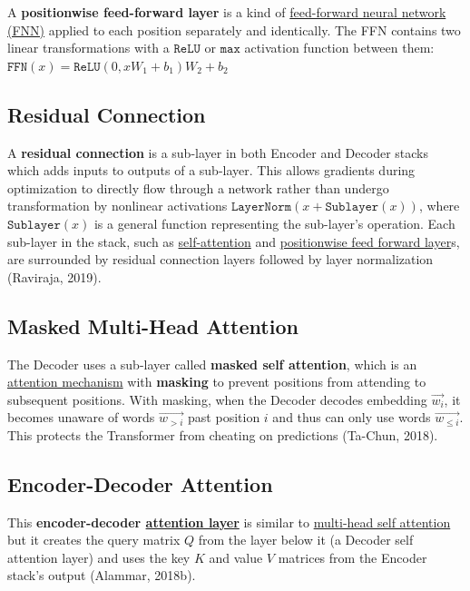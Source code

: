 A \textbf{positionwise feed-forward layer} is a kind of \hyperref[sec:NeuralNetRepr]{feed-forward neural network (FNN)} applied to each position separately and identically. The FFN contains two linear transformations with a $\texttt{ReLU}$ or $\texttt{max}$ activation function between them: $\texttt{FFN}(x) = \texttt{ReLU}(0, x W_1 + b_1) W_2 + b_2$



\subsection{Residual Connection} \label{sec:ResidualConnections}

A \textbf{residual connection} is a sub-layer in both Encoder and Decoder stacks which adds inputs to outputs of a sub-layer. This allows gradients during optimization to directly flow through a network rather than undergo transformation by nonlinear activations $\texttt{LayerNorm}(x + \texttt{Sublayer}(x))$, where $\texttt{Sublayer}(x)$ is a general function representing the sub-layer's operation. Each sub-layer in the stack, such as \hyperref[sec:SelfAttention]{self-attention} and \hyperref[sec:PositionwiseFFNLayers]{positionwise feed forward layer}s, are surrounded by residual connection layers followed by layer normalization (Raviraja, 2019). 




\subsection{Masked Multi-Head Attention} \label{sec:MaskedMultiHeadAttention}

The Decoder uses a sub-layer called \textbf{masked self attention}, which is an \hyperref[sec:AttentionMechanism]{attention mechanism} with \textbf{masking} to prevent positions from attending to subsequent positions. With masking, when the Decoder decodes embedding $\overrightarrow{w_i}$, it becomes unaware of words  $\overrightarrow{w_{>i}}$ past position $i$ and thus can only use words $\overrightarrow{w_{\leq i}}$. This protects the Transformer from cheating on predictions (Ta-Chun, 2018). 

\subsection{Encoder-Decoder Attention} \label{sec:EncoderDecoderAttention}

This \textbf{encoder-decoder \hyperref[sec:AttentionMechanism]{attention layer}} is similar to \hyperref[sec:MultiHeadAttention]{multi-head self attention} but it creates the query matrix $Q$ from the layer below it (a Decoder self attention layer) and uses the key $K$ and value $V$ matrices from the Encoder stack's output (Alammar, 2018b). 



